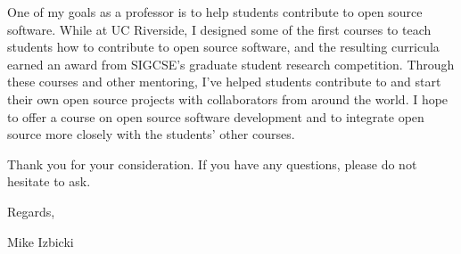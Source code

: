 \documentclass[12pt]{article}
\newcommand{\school}[2]{\textcolor{red}{\textbf{{#1}:} {#2}}}
\begin{document}
\noindent
One of my goals as a professor is to help students contribute to open source software.
While at UC Riverside, I designed some of the first courses to teach students how to contribute to open source software,
and the resulting curricula earned an award from SIGCSE's graduate student research competition.
Through these courses and other mentoring, 
I've helped students contribute to and start their own open source projects with collaborators from around the world.
I hope to offer a course on open source software development
and to integrate open source more closely with the students' other courses.

\noindent
Thank you for your consideration.
If you have any questions,
please do not hesitate to ask.

\noindent
Regards,

\vspace{-0.10in}
\noindent
Mike Izbicki

%
%
%
%
%
\end{document}
